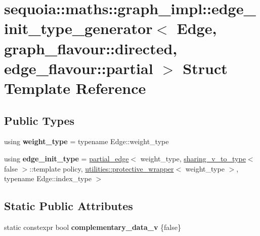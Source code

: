 \hypertarget{structsequoia_1_1maths_1_1graph__impl_1_1edge__init__type__generator_3_01_edge_00_01graph__flavoa803d02d0461da84bd03c07855dc422d}{}\section{sequoia\+::maths\+::graph\+\_\+impl\+::edge\+\_\+init\+\_\+type\+\_\+generator$<$ Edge, graph\+\_\+flavour\+::directed, edge\+\_\+flavour\+::partial $>$ Struct Template Reference}
\label{structsequoia_1_1maths_1_1graph__impl_1_1edge__init__type__generator_3_01_edge_00_01graph__flavoa803d02d0461da84bd03c07855dc422d}
\subsection*{Public Types}
\begin{DoxyCompactItemize}
\item 
\mbox{\label{structsequoia_1_1maths_1_1graph__impl_1_1edge__init__type__generator_3_01_edge_00_01graph__flavoa803d02d0461da84bd03c07855dc422d_a9a855eeda4dfbb73b5aa0953a5114007}} 
using {\bfseries weight\+\_\+type} = typename Edge\+::weight\+\_\+type
\item 
\mbox{\label{structsequoia_1_1maths_1_1graph__impl_1_1edge__init__type__generator_3_01_edge_00_01graph__flavoa803d02d0461da84bd03c07855dc422d_affdcee177eb49195d766ae4fb3462952}} 
using {\bfseries edge\+\_\+init\+\_\+type} = \mbox{\hyperlink{classsequoia_1_1maths_1_1partial__edge}{partial\+\_\+edge}}$<$ weight\+\_\+type, \mbox{\hyperlink{structsequoia_1_1maths_1_1graph__impl_1_1sharing__v__to__type}{sharing\+\_\+v\+\_\+to\+\_\+type}}$<$ false $>$\+::template policy, \mbox{\hyperlink{classsequoia_1_1utilities_1_1protective__wrapper}{utilities\+::protective\+\_\+wrapper}}$<$ weight\+\_\+type $>$, typename Edge\+::index\+\_\+type $>$
\end{DoxyCompactItemize}
\subsection*{Static Public Attributes}
\begin{DoxyCompactItemize}
\item 
\mbox{\label{structsequoia_1_1maths_1_1graph__impl_1_1edge__init__type__generator_3_01_edge_00_01graph__flavoa803d02d0461da84bd03c07855dc422d_ade66ab28a2de90ec11be9e6d8e965d4c}} 
static constexpr bool {\bfseries complementary\+\_\+data\+\_\+v} \{false\}
\end{DoxyCompactItemize}


